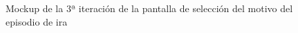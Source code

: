 \begin{figure}[H]
    \centering
    \begin{minipage}{.6\textwidth}
        \centering
        \caption[Mockup de la 3ª iteración de la pantalla de selección del motivo del episodio de ira]{Mockup de la 3ª iteración de la pantalla de selección del motivo del episodio de ira}
        \label{c4:fig:v3:android:11Episode1}
    \end{minipage}
\end{figure}

